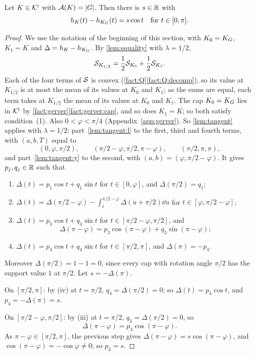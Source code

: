\begin{proposition}\label{prop:kernel}
Let $K\in\mathcal{K}^{\mathrm{i}}$ with $\mathcal{A}(K)=\lvert G\rvert$. Then there is $s\in\mathbb{R}$ with
\[
  h_K(t)-h_{K_G}(t)=s\cos t\quad\text{for }t\in[0,\pi].
\]
\end{proposition}

\begin{proof}
We use the notation of the beginning of this section, with $K_0=K_G$, $K_1=K$
and $\Delta=h_K-h_{K_G}$. By \cref{lem:equality} with $\lambda=1/2$,
\[
  \mathcal{S}_{K_{1/2}}=\frac12\mathcal{S}_{K_0}+\frac12\mathcal{S}_{K_1}.
\]
Each of the four terms of $\mathcal{S}$ is convex (\cref{fact:Q}\ref{fact:Q:decomp}),
so its value at $K_{1/2}$ is at most the mean of its values at $K_0$ and $K_1$;
as the sums are equal, each term takes at $K_{1/2}$ the mean of its values at
$K_0$ and $K_1$. The cap $K_0=K_G$ lies in $\mathcal{K}^{\mathrm{i}}$ by
\cref{fact:gerver}\ref{fact:gerver:cap}, and so does $K_1=K$; so both satisfy
condition~(1). Also $0<\varphi<\pi/4$ (Appendix~\ref{app:gerver}). So
\cref{lem:tangent} applies with $\lambda=1/2$: part~\ref{lem:tangent:l} to the
first, third and fourth terms, with $(a,b,T)$ equal to
\[
  (0,\varphi,\pi/2),\qquad(\pi/2-\varphi,\pi/2,\pi-\varphi),\qquad
  (\pi/2,\pi,\pi),
\]
and part~\ref{lem:tangent:y} to the second, with
$(a,b)=(\varphi,\pi/2-\varphi)$. It gives $p_j,q_j\in\mathbb{R}$ such that
\begin{enumerate}[label=(\roman*)]
\item $\Delta(t)=p_1\cos t+q_1\sin t$ for $t\in[0,\varphi]$, and
$\Delta(\pi/2)=q_1$;
\item $\Delta(t)=\Delta(\pi/2-\varphi)-\int_t^{\pi/2-\varphi}\Delta(u+\pi/2)\dd
u$ for $t\in[\varphi,\pi/2-\varphi]$;
\item $\Delta(t)=p_3\cos t+q_3\sin t$ for $t\in[\pi/2-\varphi,\pi/2]$, and
\[
  \Delta(\pi-\varphi)=p_3\cos(\pi-\varphi)+q_3\sin(\pi-\varphi);
\]
\item $\Delta(t)=p_4\cos t+q_4\sin t$ for $t\in[\pi/2,\pi]$, and
$\Delta(\pi)=-p_4$.
\end{enumerate}
Moreover $\Delta(\pi/2)=1-1=0$, since every cap with rotation angle $\pi/2$ has
the support value $1$ at $\pi/2$. Let $s=-\Delta(\pi)$.

On $[\pi/2,\pi]$: by (iv) at $t=\pi/2$, $q_4=\Delta(\pi/2)=0$; so
$\Delta(t)=p_4\cos t$, and $p_4=-\Delta(\pi)=s$.

On $[\pi/2-\varphi,\pi/2]$: by (iii) at $t=\pi/2$, $q_3=\Delta(\pi/2)=0$, so
\[
  \Delta(\pi-\varphi)=p_3\cos(\pi-\varphi).
\]
As $\pi-\varphi\in[\pi/2,\pi]$, the previous step gives
$\Delta(\pi-\varphi)=s\cos(\pi-\varphi)$, and
$\cos(\pi-\varphi)=-\cos\varphi\ne0$; so $p_3=s$.


\end{proof}
